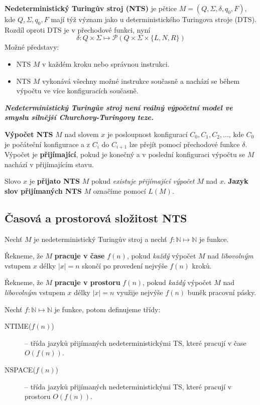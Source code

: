 \documentclass[11pt]{report} %
\newcommand{\N}{\mathbb{N}}
\numberwithin{equation}{section}
\begin{document}
\textbf{Nedeterministický Turingův stroj (NTS)} je pětice $M = (Q, \Sigma, \delta, q_0, F)$, kde $Q, \Sigma, q_0, F$ mají týž význam jako u  deterministického Turingova stroje (DTS). Rozdíl oproti DTS je v přechodové funkci, nyní
$$\delta : Q \times \Sigma \mapsto \mathcal{P}(Q \times \Sigma \times \{L, N, R\})$$
Možné představy:
\begin{itemize}
	
	
	\item NTS $M$ v každém kroku  nebo  správnou instrukci.
	\item NTS $M$ vykonává všechny možné instrukce současně a nachází se během výpočtu ve více konfiguracích současně.
\end{itemize}

\textbf{\textit{Nedeterministický Turingův stroj není reálný výpočetní model ve smyslu silnější Churchovy-Turingovy teze.}}
\medskip

\textbf{Výpočet NTS} $M$ nad slovem $x$ je posloupnost konfigurací $C_0, C_1, C_2, \dots$, kde $C_0$ je počáteční konfigurace a z $C_i$ do $C_{i+1}$ lze přejít pomocí přechodové funkce $\delta$. Výpočet je \textbf{přijímající}, pokud je konečný a v poslední konfiguraci výpočtu se $M$ nachází v přijímajícím stavu.

Slovo $x$ je \textbf{přijato NTS} $M$ pokud \textit{existuje přijímající výpočet} $M$ nad $x$. \textbf{Jazyk slov přijímaných NTS} $M$ označíme pomocí $L(M)$.

\subsection{Časová a prostorová složitost NTS}
Nechť $M$ je nedeterministický Turingův stroj a nechť $f : \N \mapsto \N$ je funkce.

Řekneme, že $M$ \textbf{pracuje v čase} $f(n)$, pokud \textit{každý} výpočet $M$ nad \textit{libovolným} vstupem $x$ délky $|x| = n$ skončí po provedení nejvýše $f(n)$ kroků.

Řekneme, že $M$ \textbf{pracuje v prostoru} $f(n)$, pokud \textit{každý} výpočet $M$ nad \textit{libovolným} vstupem $x$ délky $|x| = n$ využije nejvýše $f(n)$ buněk pracovní pásky.

Nechť $f : \N \mapsto \N$ je funkce, potom definujeme třídy:
\begin{description}
	\item[NTIME($f(n)$)] – třída jazyků přijímaných nedeterministickými TS, které pracují v čase $O(f(n))$.
	\item[NSPACE($f(n)$)] – třída jazyků přijímaných nedeterministickými TS, které pracují v prostoru $O(f(n))$.
\end{description}
\end{document}
